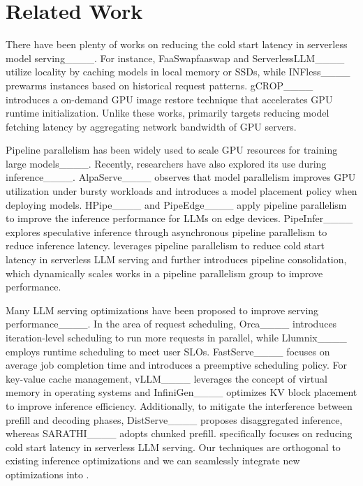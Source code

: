 \section{Related Work}
\label{sec:related}


There have been plenty of works on reducing the cold start latency in serverless model serving____.
For instance, FaaSwap{faaswap} and ServerlessLLM____ utilize locality by caching models in local memory or SSDs,
while INFless____ prewarms instances based on historical request patterns.
gCROP____ introduces a on-demand GPU image restore technique that accelerates GPU runtime initialization.
Unlike these works, \sysname primarily targets reducing model fetching latency by aggregating network bandwidth of GPU servers.

Pipeline parallelism has been widely used to scale GPU resources for training large models____.
Recently, researchers have also explored its use during inference____.
AlpaServe____ observes that model parallelism improves GPU utilization under bursty workloads and introduces a model placement policy when deploying models.
HPipe____ and PipeEdge____ apply pipeline parallelism to improve the inference performance for LLMs on edge devices.
PipeInfer____ explores speculative inference through asynchronous pipeline parallelism to reduce inference latency.
\sysname leverages pipeline parallelism to reduce cold start latency in serverless LLM serving and
further introduces pipeline consolidation, which dynamically scales works in a pipeline parallelism group to improve performance.

Many LLM serving optimizations have been proposed to improve serving performance____.
In the area of request scheduling, Orca____ introduces iteration-level scheduling to run more requests in parallel,
while Llumnix____ employs runtime scheduling to meet user SLOs.
FastServe____ focuses on average job completion time and introduces a preemptive scheduling policy.
For key-value cache management,
vLLM____ leverages the concept of virtual memory in operating systems and InfiniGen____ optimizes KV block placement to improve inference efficiency.
Additionally, to mitigate the interference between prefill and decoding phases, DistServe____ proposes disaggregated inference,
whereas SARATHI____ adopts chunked prefill.
\sysname specifically focuses on reducing cold start latency in serverless LLM serving.
Our techniques are orthogonal to existing inference optimizations and we can seamlessly integrate new optimizations into \sysname.